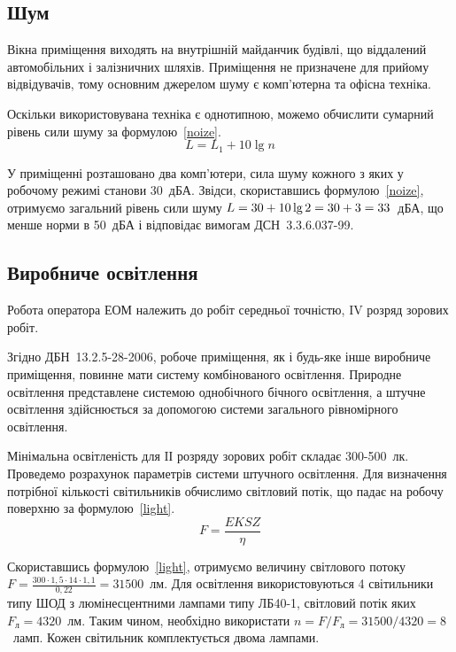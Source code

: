 \documentclass{diploma}
\begin{document}
\subsection{Шум}
Вікна приміщення виходять на внутрішній майданчик будівлі, що віддалений автомобільних і залізничних шляхів. Приміщення не призначене для прийому відвідувачів, тому основним джерелом шуму є комп’ютерна та офісна техніка.

Оскільки використовувана техніка є однотипною, можемо обчислити сумарний рівень сили шуму за формулою~\ref{noize}.
\begin{equation} \label{noize}
	L = L_1 + 10 \lg n
\end{equation}

У приміщенні розташовано два комп’ютери, сила шуму кожного з яких у робочому режимі станови 30~дБА. Звідси, скориставшись формулою~\ref{noize}, отримуємо загальний рівень сили шуму $L = 30 + 10 \lg 2 = 30 + 3 =\\ 33$~дБА, що менше норми в 50~дБА і відповідає вимогам ДСН~3.3.6.037-99.

\subsection{Виробниче освітлення}
Робота оператора ЕОМ належить до робіт середньої точністю, IV розряд зорових робіт.

Згідно ДБН~13.2.5-28-2006, робоче приміщення, як і будь-яке інше виробниче приміщення, повинне мати систему комбінованого освітлення. Природне освітлення представлене системою однобічного бічного освітлення, а штучне освітлення здійснюється за допомогою системи загального рівномірного освітлення.

Мінімальна освітленість для IІ розряду зорових робіт складає 300-500~лк. Проведемо розрахунок параметрів системи штучного освітлення. Для визначення потрібної кількості світильників обчислимо світловий потік, що падає на робочу поверхню за формулою~\ref{light}.
\begin{equation} \label{light}
	F = \frac{EKSZ}{\eta}
\end{equation}

Скориставшись формулою~\ref{light}, отримуємо величину світлового потоку $F = \frac{300 \cdot 1,5 \cdot 14 \cdot 1,1}{0,22} = 31500$~лм. Для освітлення використовуються 4 світильники типу ШОД з люмінесцентними лампами типу ЛБ40-1, світловий потік яких $F_\text{л} = 4320$~лм. Таким чином, необхідно використати $n = F/F_\text{л} = 31500/4320 = 8$~ламп. Кожен світильник комплектується двома лампами.
\end{document}
